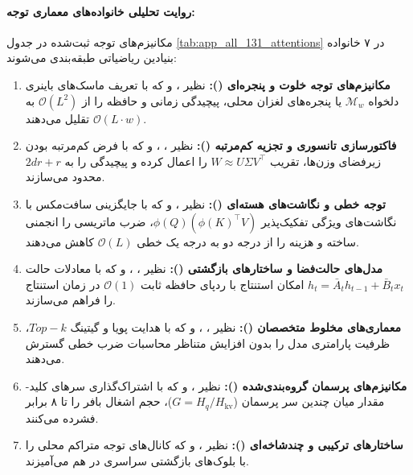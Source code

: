 \paragraph{روایت تحلیلی خانواده‌های معماری توجه:}
مکانیزم‌های توجه ثبت‌شده در جدول \ref{tab:app_all_131_attentions} در ۷ خانواده بنیادین ریاضیاتی طبقه‌بندی می‌شوند:
\begin{enumerate}
    \item \textbf{مکانیزم‌های توجه خلوت و پنجره‌ای ():} نظیر ،  و  که با تعریف ماسک‌های باینری دلخواه $\mathcal{M}_w$ یا پنجره‌های لغزان محلی، پیچیدگی زمانی و حافظه را از $\mathcal{O}(L^2)$ به $\mathcal{O}(L \cdot w)$ تقلیل می‌دهند.
    \item \textbf{فاکتورسازی تانسوری و تجزیه کم‌مرتبه ():} نظیر ، ،  و  که با فرض کم‌مرتبه بودن زیرفضای وزن‌ها، تقریب $W \approx U \Sigma V^\top$ را اعمال کرده و پیچیدگی را به $2 d r + r$ محدود می‌سازند.
    \item \textbf{توجه خطی و نگاشت‌های هسته‌ای ():} نظیر ،  و  که با جایگزینی سافت‌مکس با نگاشت‌های ویژگی تفکیک‌پذیر $\phi(Q) (\phi(K)^\top V)$، ضرب ماتریسی را انجمنی ساخته و هزینه را از درجه دو به درجه یک خطی $\mathcal{O}(L)$ کاهش می‌دهند.
    \item \textbf{مدل‌های حالت‌فضا و ساختارهای بازگشتی ():} نظیر ، ،  و  که با معادلات حالت $h_t = \bar{A}_t h_{t-1} + \bar{B}_t x_t$ امکان استنتاج با ردپای حافظه ثابت $\mathcal{O}(1)$ در زمان استنتاج را فراهم می‌سازند.
    \item \textbf{معماری‌های مخلوط متخصصان ():} نظیر ، ،  و  که با هدایت پویا و گیتینگ $Top-k$، ظرفیت پارامتری مدل را بدون افزایش متناظر محاسبات ضرب خطی گسترش می‌دهند.
    \item \textbf{مکانیزم‌های پرسمان گروه‌بندی‌شده ():} نظیر ،  و  که با اشتراک‌گذاری سرهای کلید-مقدار میان چندین سر پرسمان ($G = H_q / H_{\text{kv}}$)، حجم اشغال بافر  را تا ۸ برابر فشرده می‌کنند.
    \item \textbf{ساختارهای ترکیبی و چندشاخه‌ای ():} نظیر ،  و  که کانال‌های توجه متراکم محلی را با بلوک‌های بازگشتی سراسری در هم می‌آمیزند.
\end{enumerate}

